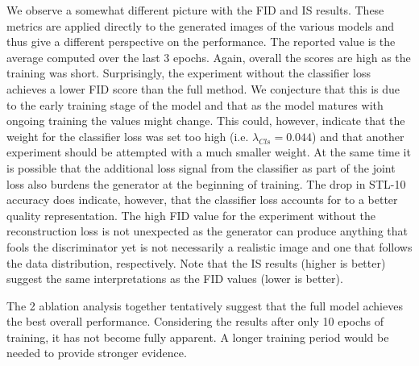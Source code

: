 \documentclass[a4paper,12pt]{report}
\begin{document}
We observe a somewhat different picture with the FID and IS results. These metrics are applied directly to the generated images of the various models and thus give a different perspective on the performance. The reported value is the average computed over the last 3 epochs. Again, overall the scores are high as the training was short. Surprisingly, the experiment without the classifier loss achieves a lower FID score than the full method. We conjecture that this is due to the early training stage of the model and that as the model matures with ongoing training the values might change. This could, however, indicate that the weight for the classifier loss was set too high (i.e. $\lambda_{Cls} = 0.044$) and that another experiment should be attempted with a much smaller weight. At the same time it is possible that the additional loss signal from the classifier as part of the joint loss also burdens the generator at the beginning of training. The drop in STL-10 accuracy does indicate, however, that the classifier loss accounts for to a better quality representation. The high FID value for the experiment without the reconstruction loss is not unexpected as the generator can produce anything that fools the discriminator yet is not necessarily a realistic image and one that follows the data distribution, respectively. Note that the IS results (higher is better) suggest the same interpretations as the FID values (lower is better).

The 2 ablation analysis together tentatively suggest that the full model achieves the best overall performance. Considering the results after only 10 epochs of training, it has not become fully apparent. A longer training period would be needed to provide stronger evidence.

% 
% 	
% 
\end{document}
